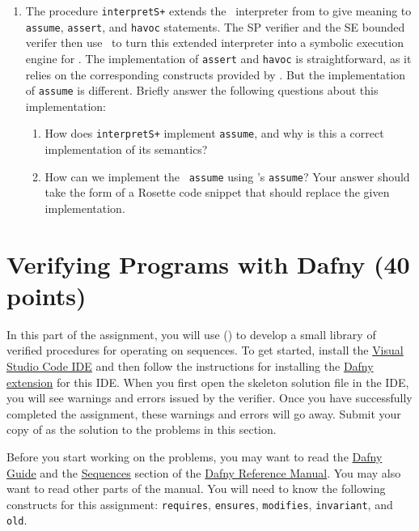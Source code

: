 \documentclass{handout}
\begin{document}
\begin{questions}
\begin{enumerate}
\item The procedure \lstinline{interpretS+} extends the \imp\ interpreter from
  to give meaning to \lstinline{assume}, \lstinline{assert},
 and \lstinline{havoc} statements. The SP verifier and the SE bounded verifer
 then use \rosette\ to turn this extended interpreter into a symbolic execution
 engine for \ivl. The implementation of \lstinline{assert} and \lstinline{havoc}
 is straightforward, as it relies on the corresponding constructs provided by
 \rosette. But the implementation of \lstinline{assume} is different.
 Briefly answer the following questions about this implementation:
 \begin{enumerate}
  \item How does \lstinline{interpretS+} implement \lstinline{assume}, and why
  is this a correct implementation of its semantics?
  \item How can we implement the \imp\ \lstinline{assume} using \rosette's
  \lstinline{assume}?  Your answer should take the form of a Rosette code
  snippet that should replace the given implementation.
 \end{enumerate}

 \end{enumerate}




\end{questions}

\section{Verifying Programs with Dafny (40 points)}

In this part of the assignment, you will use \dafny () to develop a
small library of verified procedures for operating on sequences. To get started,
install the \href{https://code.visualstudio.com}{Visual Studio Code IDE} and
then follow the instructions for installing the
\href{https://github.com/dafny-lang/dafny/wiki/INSTALL#visual-studio-code}{Dafny
extension} for this IDE. When you first open the skeleton solution file
 in the IDE, you will see warnings and errors issued by
the verifier. Once you have successfully completed the assignment, these
warnings and errors will go away. Submit your copy of  as
the solution to the problems in this section.

Before you start working on the problems, you may want to read  the
\href{https://dafny-lang.github.io/dafny/OnlineTutorial/guide}{Dafny Guide} and the
\href{https://dafny-lang.github.io/dafny/DafnyRef/DafnyRef#sec-sequences}{Sequences}
section of the \href{https://dafny-lang.github.io/dafny/DafnyRef/DafnyRef#sec-sequences}{Dafny Reference Manual}.
You may also want to read other parts of the manual.  You will need to know the following
constructs for this assignment: \lstinline{requires}, \lstinline{ensures},
\lstinline{modifies}, \lstinline{invariant}, and \lstinline{old}.
\end{document}

